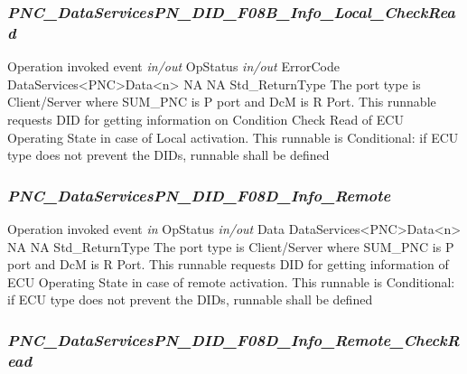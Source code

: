 {  }

\subsubsection{\textit{PNC_DataServicesPN_DID_F08B_Info_Local_CheckRead}}

{Operation invoked event}
{\textit{in/out} \hspace*{1.2in} \vrule \hspace*{0.1in} OpStatus \newline \textit{in/out} \hspace*{1.2in} \vrule \hspace*{0.1in} ErrorCode}
{DataServices<PNC>Data<n>}
{NA}
{NA}
{Std_ReturnType}
{The port type is Client/Server where SUM_PNC is P port and DcM is R Port. This runnable requests DID for getting information on Condition Check Read of ECU Operating State in case of Local activation. This runnable is Conditional: if ECU type does not prevent the DIDs, runnable shall be defined}

{ }

\subsubsection{\textit{PNC_DataServicesPN_DID_F08D_Info_Remote}}

{Operation invoked event}
{\textit{in} \hspace*{1.2in} \vrule \hspace*{0.1in} OpStatus \newline \textit{in/out} \hspace*{0.95in} \vrule \hspace*{0.1in} Data}
{DataServices<PNC>Data<n>}
{NA}
{NA}
{Std_ReturnType}
{The port type is Client/Server where SUM_PNC is P port and DcM is R Port. This runnable requests DID for getting information of ECU Operating State in case of remote activation. This runnable is Conditional: if ECU type does not prevent the DIDs, runnable shall be defined}

{  }

\subsubsection{\textit{PNC_DataServicesPN_DID_F08D_Info_Remote_CheckRead}}

